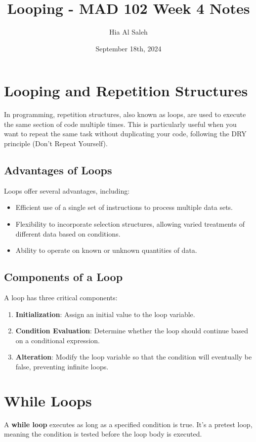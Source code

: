 \documentclass{article}
\title{Looping - MAD 102 Week 4 Notes}
\author{Hia Al Saleh}
\date{September 18th, 2024}
\begin{document}
\maketitle
\tableofcontents 
\newpage
\section{Looping and Repetition Structures}
In programming, repetition structures, also known as loops, are used to execute the same section of code multiple times. This is particularly useful when you want to repeat the same task without duplicating your code, following the DRY principle (Don’t Repeat Yourself).

\subsection{Advantages of Loops}
Loops offer several advantages, including:
\begin{itemize}
    \item Efficient use of a single set of instructions to process multiple data sets.
    \item Flexibility to incorporate selection structures, allowing varied treatments of different data based on conditions.
    \item Ability to operate on known or unknown quantities of data.
\end{itemize}

\subsection{Components of a Loop}
A loop has three critical components:
\begin{enumerate}
    \item \textbf{Initialization}: Assign an initial value to the loop variable.
    \item \textbf{Condition Evaluation}: Determine whether the loop should continue based on a conditional expression.
    \item \textbf{Alteration}: Modify the loop variable so that the condition will eventually be false, preventing infinite loops.
\end{enumerate}

\section{While Loops}
A \textbf{while loop} executes as long as a specified condition is true. It's a pretest loop, meaning the condition is tested before the loop body is executed.
\end{document}
